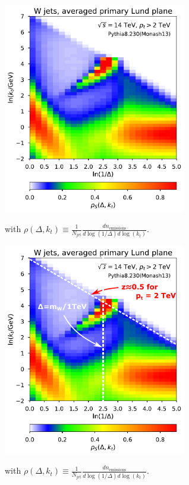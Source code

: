 \documentclass[9pt,a4paper,unknownkeysallowed,xcolor=dvipsnames,aspectratio=43]{beamer}
\begin{document}
%
%
\begin{frame}
\vspace{2mm}
\begin{center}
\includegraphics[width=0.6\textwidth]{05/wjet.pdf}
\end{center}
with $
\rho(\Delta,k_t) \equiv \frac{1}{N_\text{jet}}\frac{dn_\text{emissions}}{d\log(1/\Delta)d\log(k_t)}
$.
\end{frame}
%
%
\begin{frame}
\vspace{2mm}
\begin{center}
\includegraphics[width=0.6\textwidth]{05/wjetdm.pdf}
\end{center}
with $
\rho(\Delta,k_t) \equiv \frac{1}{N_\text{jet}}\frac{dn_\text{emissions}}{d\log(1/\Delta)d\log(k_t)}
$.
\end{frame}
\end{document}
